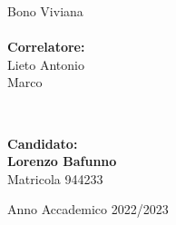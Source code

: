 \begin{titlepage}
\begin{minipage}[t]{0.47\textwidth}
{            Bono Viviana}\\
        \vspace{4mm}
        \\
        {\large{\bf Correlatore:}\\
        Lieto Antonio\\
        Marco
        }
    \end{minipage}
    \\
    \null\hfill
    \begin{minipage}[t]{0.40\textwidth}
        \vspace{20mm}
        {\large{\bf Candidato:\\
                Lorenzo Bafunno\\
            } \large{Matricola 944233}}
    \end{minipage}
    \vspace{10mm}
    \begin{center}
        {\large{Anno Accademico 2022/2023}}
    \end{center}

\end{titlepage}